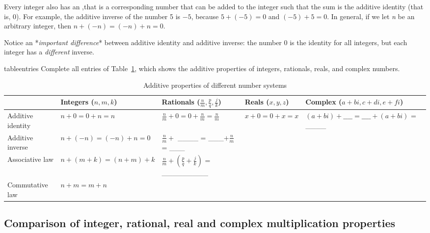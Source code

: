 Every integer also has an ,that is a corresponding number that can be added to the integer such
that the sum is the additive identity (that is, 0). For example, the
additive inverse of the number 5 is $-5$, because $5+(-5)=0$ and
$(-5)+5=0$. In general, if we let \emph{n }be an arbitrary integer,
then $n+(-n)=(-n)+n=0$.

Notice an {*}\emph{important difference}{*} between additive
identity and additive inverse: the number 0 is the identity for all
integers, but each integer has a \emph{different} inverse.

\begin{exercise}{tableentries}
Complete all entries of Table~\ref{additive_table}, which shows the additive properties of integers,
rationals, reals, and complex numbers.
\begin{table}[!htb]
\caption{Additive properties of different number systems}\label{additive_table}
\begin{tabular}{|p{2.1cm}|p{2.1cm}|p{2.1cm}|p{2.1cm}|p{3.0cm}|}
\hline 
\rule{0pt}{2.6ex} &Integers ($n,m,k$)  & Rationals ($\frac{n}{m},\frac{p}{q},\frac{j}{k}$)  & Reals ($x,y,z$)  & Complex  {\small($a+bi,c+di,e+fi$)}\rule[-1.2ex]{0pt}{0pt} \tabularnewline
\hline
\hline 
\rule{0pt}{2.6ex} Additive  identity  &  $n+0 = 0+n  =n$   & $\frac{n}{m}+0 = 0+\frac{n}{m}=\frac{n}{m}$  & $x+0= 0+x=x$  & {\small $(a+bi)+\_\_\_\_=  \_\_\_\_+(a+bi)$ = \_\_\_\_} \rule[-1.2ex]{0pt}{0pt} \tabularnewline
\hline 
\rule{0pt}{2.6ex} Additive inverse  & $n+(-n)=(-n)+n=0$  & $\frac{n}{m} + $ \_\_\_\_ = \_\_\_$+\frac{n}{m}$ = \_\_\_  &  & \rule[-1.2ex]{0pt}{0pt} \tabularnewline
\hline 
\rule{0pt}{2.6ex} Associative law\index{Associative property}  & $n+(m+k)=(n+m)+k$  & $\frac{n}{m}+(\frac{p}{q}+\frac{j}{k})$ = \_\_\_\_\_\_\_\_\_  &  & \rule[-1.2ex]{0pt}{0pt} \tabularnewline
\hline 
\rule{0pt}{2.6ex} Commutative law\index{Commutative property}  & $n+m=m+n$  &  &  & \rule[-1.2ex]{0pt}{0pt} \tabularnewline
\hline
\end{tabular}
\end{table}

\end{exercise}

\subsection{Comparison of integer, rational, real and complex
multiplication properties}

